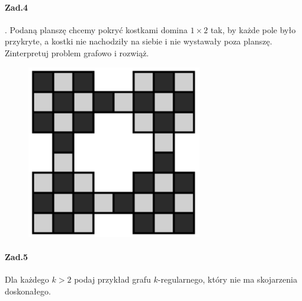 \documentclass[a4paper,12pt]{article}
\theoremstyle{definition}%
\theoremstyle{definition}
\theoremstyle{problem}
\begin{document}
\paragraph{Zad.4}. Podaną planszę chcemy pokryć kostkami domina $1 \times 2$ tak, by każde pole było przykryte, a kostki nie nachodziły na siebie i nie wystawały poza planszę. Zinterpretuj problem grafowo i rozwiąż.
\begin{figure}[H]
\centering
\includegraphics[width=.6\textwidth]{img/2_zad_4}
\end{figure}

\paragraph{Zad.5} Dla każdego $k > 2$ podaj przykład grafu $k$-regularnego, który nie ma skojarzenia doskonałego.

\end{document}
